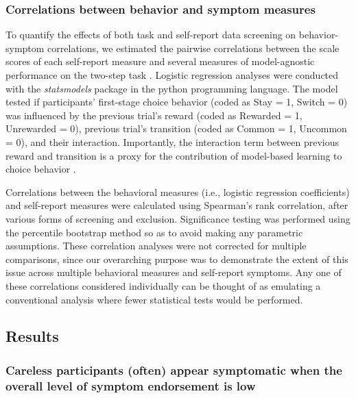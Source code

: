 \documentclass[a4paper,notitlepage,12pt]{article}
\begin{document}
\begin{refsection}[supp]
\subsubsection*{Correlations between behavior and symptom measures}

To quantify the effects of both task and self-report data screening on behavior-symptom correlations, we estimated the pairwise correlations between the scale scores of each self-report measure and several measures of model-agnostic performance on the two-step task \cite{gillan2016characterizing}. Logistic regression analyses were conducted with the \textit{statsmodels} package \cite{seabold2010statsmodels} in the python programming language. The model tested if participants' first-stage choice behavior (coded as Stay = 1, Switch = 0) was influenced by the previous trial's reward (coded as Rewarded = 1, Unrewarded = 0), previous trial's transition (coded as Common = 1, Uncommon = 0), and their interaction. Importantly, the interaction term between previous reward and transition is a proxy for the contribution of model-based learning to choice behavior \cite{gillan2016characterizing}.

Correlations between the behavioral measures (i.e., logistic regression coefficients) and self-report measures were calculated using Spearman's rank correlation, after various forms of screening and exclusion. Significance testing was performed using the percentile bootstrap method \cite{wilcox2018guide-2} so as to avoid making any parametric assumptions. These correlation analyses were not corrected for multiple comparisons, since our overarching purpose was to demonstrate the extent of this issue across multiple behavioral measures and self-report symptoms. Any one of these correlations considered individually can be thought of as emulating a conventional analysis where fewer statistical tests would be performed.

\subsection*{Results}

\subsubsection*{Careless participants (often) appear symptomatic when the overall level of symptom endorsement is low}


\end{refsection}
\end{document}
